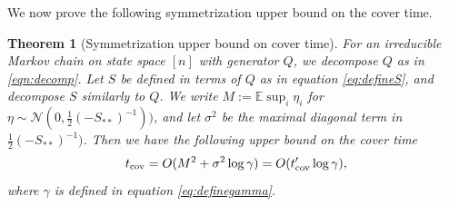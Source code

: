\documentclass[a4paper, 11pt]{article}
\newcommand{\E}{\mathbb{E}}
\newcommand{\cov}{\textnormal{cov}}
\newtheorem{thm}{Theorem}[section]
\begin{document}
We now prove the following symmetrization upper bound on the cover time.

\vspace{.3em} \begin{thm}[Symmetrization upper bound on cover time]
\label{thm:sym-cover}
For an irreducible Markov chain on state space $[n]$ with generator $Q$, we decompose $Q$ as in \cref{eqn:decomp}. Let $S$ be defined in terms of $Q$ as in equation \eqref{eq:defineS}, and decompose $S$ similarly to $Q$. We
write $M:=\E\sup_i\eta_i$ for $\eta\sim\mathcal{N}(0,\frac{1}{2}(-S_{**})^{-1}))$, and let $\sigma^2$ be the maximal diagonal term in $\frac{1}{2}(-S_{**})^{-1})$. Then we have the following upper bound on the cover time
\[t_\cov=O(M^2+\sigma^2\log\gamma)=O(t_\cov'\log\gamma),\]
where $\gamma$ is defined in equation \eqref{eq:definegamma}.
\end{thm}
\end{document}
